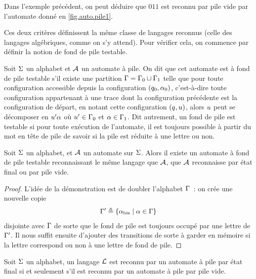 \begin{remark}
  Dans l'exemple précédent, on peut déduire que $011$ est reconnu par pile
  vide par l'automate donné en \cref{fig.auto.pile1}.
\end{remark}

Ces deux critères définissent la même classe de langages reconnus (celle des
langages algébriques, comme on s'y attend).
Pour vérifier cela, on commence par définir la notion de fond de pile testable.

\begin{definition}
  Soit $\Sigma$ un alphabet et $\mathcal{A}$ un automate à pile. On dit que cet
  automate est à fond de pile testable s'il existe une partition
  $\Gamma = \Gamma_0 \sqcup \Gamma_1$ telle que pour toute configuration accessible
  depuis la configuration $(q_{0},\alpha_0)$, c'est-à-dire toute configuration
  appartenant à une trace dont la configuration précédente est la configuration
  de départ, en notant cette configuration $(q_{},u)$, alors
  $u$ peut se décomposer en $u'\alpha$ où $u' \in \Gamma_0$ et
  $\alpha \in \Gamma_1$. Dit autrement, un fond de pile est testable si pour
  toute exécution de l'automate, il est toujours possible à partir du mot en
  tête de pile de savoir si la pile est réduite à une lettre ou non.
\end{definition}

\begin{proposition}
  Soit $\Sigma$ un alphabet, et $\mathcal{A}$ un automate sur $\Sigma$. Alors il existe
  un automate à fond de pile testable reconnaissant le même langage que
  $\mathcal{A}$, que $\mathcal{A}$ reconnaisse par état final ou par pile vide.
\end{proposition}

\begin{proof}
  L'idée de la démonstration est de doubler l'alphabet $\Gamma$~: on crée une
  nouvelle copie
  \[\Gamma' \triangleq \left\{ \alpha_{\operatorname{bis}} \;\middle\vert\; \alpha \in \Gamma \right\}\]
  disjointe avec $\Gamma$ de sorte que le fond de pile est toujours occupé par une
  lettre de $\Gamma'$. Il nous suffit ensuite d'ajouter des transitions de sorte à
  garder en mémoire si la lettre correspond ou non à une lettre de fond de pile.
\end{proof}

\begin{theorem}
  Soit $\Sigma$ un alphabet, un langage $\mathcal L$ est reconnu par un automate à
  pile par état final si et seulement s'il est reconnu par un automate à pile
  par pile vide.
\end{theorem}

